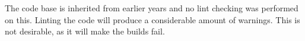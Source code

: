 
The code base is inherited from earlier years and no lint checking was performed on this. Linting the code will produce a considerable amount of warnings. This is not desirable, as it will make the builds fail.


